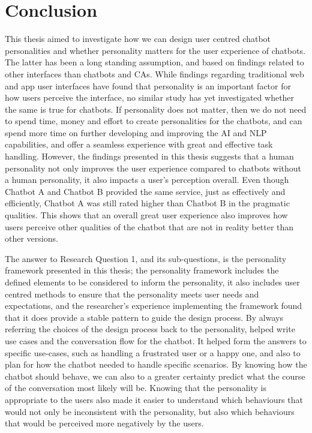 \chapter{Conclusion}
\label{chap:conclusion}

This thesis aimed to investigate how we can design user centred chatbot personalities and whether personality matters for the user experience of chatbots. The latter has been a long standing assumption, and based on findings related to other interfaces than chatbots and CAs. While findings regarding traditional web and app user interfaces have found that personality is an important factor for how users perceive the interface, no similar study has yet investigated whether the same is true for chatbots. If personality does not matter, then we do not need to spend time, money and effort to create personalities for the chatbots, and can spend more time on further developing and improving the AI and NLP capabilities, and offer a seamless experience with great and effective task handling. However, the findings presented in this thesis suggests that a human personality not only improves the user experience compared to chatbots without a human personality, it also impacts a user's perception overall. Even though Chatbot A and Chatbot B provided the same service, just as effectively and efficiently, Chatbot A was still rated higher than Chatbot B in the pragmatic qualities. This shows that an overall great user experience also improves how users perceive other qualities of the chatbot that are not in reality better than other versions.

The answer to Research Question 1, and its sub-questions, is the personality framework presented in this thesis; the personality framework includes the defined elements to be considered to inform the personality, it also includes user centred methods to ensure that the personality meets user needs and expectations, and the researcher's experience implementing the framework found that it does provide a stable pattern to guide the design process. By always referring the choices of the design process back to the personality, helped write use cases and the conversation flow for the chatbot. It helped form the answers to specific use-cases, such as handling a frustrated user or a happy one, and also to plan for how the chatbot needed to handle specific scenarios. By knowing how the chatbot should behave, we can also to a greater certainty predict what the course of the conversation most likely will be. Knowing that the personality is appropriate to the users also made it easier to understand which behaviours that would not only be inconsistent with the personality, but also which behaviours that would be perceived more negatively by the users.

